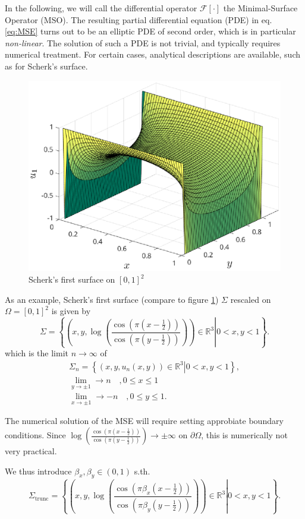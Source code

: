 \documentclass[11pt]{scrartcl}
\newcommand{\mSurf}[1]{\ensuremath{\mathcal{F}\left[#1\right]}}
\begin{document}
In the following, we will call the differential operator $\mSurf{\cdot}$ the Minimal-Surface Operator (MSO). The resulting partial differential equation (PDE) in eq. \eqref{eq:MSE} turns out to be an elliptic PDE of second order, which is in particular \textit{non-linear}. The solution of such a PDE is not trivial, and typically requires numerical treatment. For certain cases, analytical descriptions are available, such as for Scherk's surface.

\begin{figure}
	\centering
	\includegraphics[width=.5\textwidth]{figs/scherk-test}
	\caption{Scherk's first surface on $[0,1]^2$}\label{fig:scherk01}
\end{figure}


\newpage

As an example, Scherk's first surface (compare to figure \ref{fig:scherk01}) $\Sigma$ rescaled on $\Omega = [0,1]^2$ is given by
\begin{equation}
	\Sigma = \left\{ \left. \left(x, y, \log \left( \frac{\cos (\pi(x-\frac{1}{2}))}{\cos (\pi(y-\frac{1}{2}))} \right) \right) \in \mathbb{R}^{3} \right  | 0 < x, y < 1 \right\}.
\end{equation} 
which is the limit $n\to \infty$ of 
\begin{align}
\Sigma_n = \left\{ \left. \left(x, y, u_n(x,y) \right) \in \mathbb{R}^{3} \right  | 0 < x, y < 1 \right\}, \\
\lim\limits_{y\to \pm 1} \to n \quad, 0 \le x \le 1 \\
\lim\limits_{x\to \pm 1} \to -n \quad, 0 \le y \le 1.
\end{align}


The numerical solution of the MSE will require setting approbiate boundary conditions. Since $\log \left( \frac{\cos (\pi(x-\frac{1}{2}))}{\cos (\pi(y-\frac{1}{2}))} \right) \to \pm \infty $ on $\partial\Omega$, this is numerically not very practical. 

We thus introduce $\beta_x,\beta_y \in (0,1)$ s.th. 
\begin{equation}
\Sigma_{\text{trunc}} = \left\{ \left. \left(x, y, \log \left( \frac{\cos (\pi\beta_x(x-\frac{1}{2}))}{\cos (\pi\beta_y(y-\frac{1}{2}))} \right) \right) \in \mathbb{R}^{3} \right  | 0 < x, y < 1 \right\}.
\end{equation} 
\end{document}
